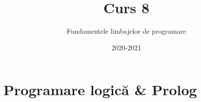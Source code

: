 \documentclass[xcolor=x11names,compress,10pt]{beamer}
\begin{document}
\title{\\Curs 8}
\author{Fundamentele limbajelor de programare} 
\date{2020-2021} 

\frame{\titlepage} 




\section{Programare logică \& Prolog} \sectionframe


%
%
\end{document}
